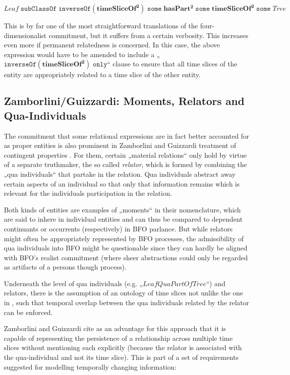 \documentclass[10pt]{bmc_article}
\newcommand{\mirel}[1]{\ensuremath{\mathrm{\mathbf{#1}}}}
\newcommand{\mclass}[1]{\ensuremath{\mathit{#1}}}
\newcommand{\mrel}[2]{\mirel{#1^#2}}
\newcommand{\mrelb}[1]{\mrel{#1}{2}}
\newenvironment{bmcformat}{\baselineskip20pt\sloppy\setboolean{publ}{false}}{\baselineskip20pt\sloppy}
\begin{document}
\begin{bmcformat}
\begin{equation}
\mclass{Leaf}\;\mathtt{subClassOf}\;\mathtt{inverseOf}(\mrelb{timeSliceOf})\;\mathtt{some}\;
            \mrelb{hasPart}\;\mathtt{some}\;\mrelb{timeSliceOf}\;\mathtt{some}\;\mclass{Tree}
\label{eq:fifteen}
\end{equation}

This is by far one of the most straightforward translations of the
four-dimensionalist commitment, but it suffers from a certain verbosity. This
increases even more if permanent relatedness is concerned. In this case, the
above expression would have to be amended to include a
„$\mathtt{inverseOf}(\mrelb{timeSliceOf})\;\mathtt{only}$“ clause to ensure that
all time slices of the entity are appropriately related to a time slice of the
other entity.

\subsection*{Zamborlini/Guizzardi: Moments, Relators and Qua-Individuals}
The commitment that some relational expressions are in fact better accounted for
as proper entities is also prominent in Zamborlini and Guizzardi treatment of 
contingent properties \cite{Zamborlini:Guizzardi}. For them, certain „material
relations“ only hold by virtue of a separate truthmaker, the so called
\emph{relator}, which is formed by combining the „qua individuals“ that
partake in the relation. Qua individuals abstract away certain aspects of an
individual so that only that information remains which is relevant for the
individuals participation in the relation. 

Both kinds of entities are examples of „moments“ in their
nomenclature, which are said to inhere in individual entities and can thus be
compared to dependent continuants or occurrents (respectively) in BFO
parlance. But while relators might often be appropriately represented by BFO
processes, the admissibility of qua individuals into BFO might be questionable
since they can hardly be aligned with BFO's realist commitment (where sheer
abstractions could only be regarded as artifacts of a persons though process). 

Underneath the level of qua individuals (e.g. „$\mclass{LeafQuaPartOfTree}$“)
and relators, there is the assumption of an ontology of time slices not unlike
the one in \cite{Welty:2006}, such that
temporal overlap between the qua individuals related by the relator can be
enforced.

Zamborlini and Guizzardi cite as an advantage for this approach that it is capable
of representing the persistence of a relationship across multiple time slices
without mentioning each explicitly (because the relator is associated with the
qua-individual and not its time slice). This is part of a set of requirements
suggested for modelling temporally changing information:


\end{bmcformat}
\end{document}
